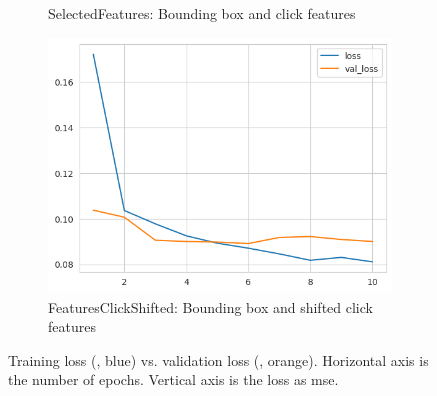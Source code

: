\begin{figure}[htbp!]
\begin{subfigure}[b]{0.45\textwidth}
    \caption{SelectedFeatures: Bounding box and click features}
    \label{fig:model_history_loss_features}
  \end{subfigure}
  \hfill
  \begin{subfigure}[b]{0.8\textwidth}
    \centering
    \includegraphics[width=\textwidth]{graphics/model_history_loss_features_shifted}
    \caption{FeaturesClickShifted: Bounding box and shifted click features}
    \label{fig:model_history_loss_features_shifted}
  \end{subfigure}
  \caption[Training loss vs. validation loss]{Training loss (, blue) vs. validation loss (, orange). Horizontal axis is the number of epochs. Vertical axis is the loss as \gls{mse}.}
  \label{fig:model_history_losses}
\end{figure}

